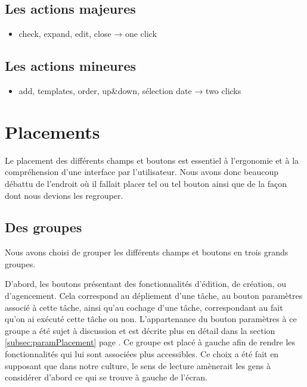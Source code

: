 \documentclass[11pt]{article}
\begin{document}


\subsection{Les actions majeures}
\begin{itemize}
\item check, expand, edit, close
  → one click
\end{itemize}


\subsection{Les actions mineures}
\begin{itemize}
\item add, templates, order, up\&down, sélection date
  → two clicks
\end{itemize}


\section{Placements}

Le placement des différents champs et boutons est essentiel à
l'ergonomie et à la compréhension d'une interface par
l'utilisateur. Nous avons donc beaucoup débattu de l'endroit où il
fallait placer tel ou tel bouton ainsi que de la façon dont nous
devions les regrouper.



\subsection{Des groupes}

Nous avons choisi de grouper les différents champs et boutons en trois
grands groupes. 

D'abord, les boutons présentant des fonctionnalités
d'édition, de création, ou d'agencement. Cela correspond au dépliement
d'une tâche, au bouton paramètres associé à cette tâche, ainsi qu'au
cochage d'une tâche, correspondant au fait qu'on ai exécuté cette
tâche ou non. L'appartenance du bouton paramètres à ce groupe a été
sujet à discussion et est décrite plus en détail dans la section
\ref{subsec:paramPlacement} page \pageref{subsec:paramPlacement}. Ce
groupe est placé à gauche afin de rendre les fonctionnalités qui lui
sont associées plus accessibles. Ce choix a été fait en supposant que
dans notre culture, le sens de lecture amènerait les gens à considérer
d'abord ce qui se trouve à gauche de l'écran.
\end{document}
